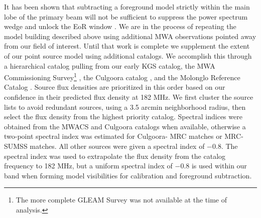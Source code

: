 \documentclass[iop]{emulateapj}
\begin{document}
It has been shown that subtracting a foreground model strictly within the main lobe of the 
primary beam will not be sufficient to suppress the power spectrum wedge and unlock the 
EoR window \citep{Thyagarajan:2015b, Thyagarajan:2015, Pober:2016}. 
We are in the process of repeating the model building described above using additional
MWA observations pointed away from our field of interest.
Until that work is complete we supplement the extent of 
our point source model using additional catalogs. We accomplish this through a hierarchical 
catalog pulling from our early KGS catalog, the MWA Commissioning Survey\footnote{The 
more complete GLEAM Survey \citep[][Hurley-Walker et al., in collaboration review]
{Wayth:2015} was not available at the time of analysis.} \citep[MWACS, ][]
{Hurley-Walker:2014}, the Culgoora catalog \citep{Slee:1977}, and the Molonglo Reference Catalog 
\citep[MRC, ][]{Large:1981}. Source flux densities are prioritized in this order based on our 
confidence in their predicted flux density at 182 MHz. We first cluster the source lists to avoid 
redundant sources, using a 3.5 arcmin neighborhood radius, then select the flux density from the 
highest priority catalog. Spectral indices were obtained from the MWACS and Culgoora 
catalogs when available, otherwise a two-point spectral index was estimated for Culgoora-
MRC matches or MRC-SUMSS matches. All other sources were given a spectral index of 
$-0.8$. The spectral index was used to extrapolate the flux density from the catalog frequency to 
182 MHz, but a uniform spectral index of $-0.8$ is used within our band when forming 
model visibilities for calibration and foreground subtraction.
\end{document}
